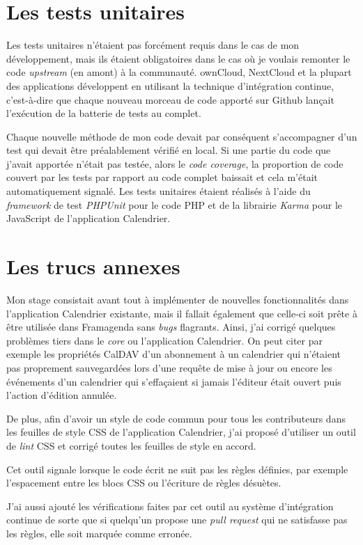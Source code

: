 \documentclass[10pt,a4paper]{report}
\begin{document}
	\section{Les tests unitaires}
	Les tests unitaires n'étaient pas forcément requis dans le cas de mon développement, mais ils étaient obligatoires dans le cas où je voulais remonter le code \textit{upstream} (en amont) à la communauté. ownCloud, NextCloud et la plupart des applications développent en utilisant la technique d'intégration continue, c'est-à-dire que chaque nouveau morceau de code apporté sur Github lançait l'exécution de la batterie de tests au complet. 
	
	Chaque nouvelle méthode de mon code devait par conséquent s'accompagner d'un test qui devait être préalablement vérifié en local. Si une partie du code que j'avait apportée n'était pas testée, alors le \textit{code coverage}, la proportion de code couvert par les tests par rapport au code complet baissait et cela m'était automatiquement signalé. Les tests unitaires étaient réalisés à l'aide du \textit{framework} de test \textit{PHPUnit} pour le code PHP et de la librairie \textit{Karma} pour le JavaScript de l'application Calendrier.
	
	\section{Les trucs annexes}
	Mon stage consistait avant tout à implémenter de nouvelles fonctionnalités dans l'application Calendrier existante, mais il fallait également que celle-ci soit prête à être utilisée dans Framagenda sans \textit{bugs} flagrants. Ainsi, j'ai corrigé quelques problèmes tiers dans le \textit{core} ou l'application Calendrier.
	On peut citer par exemple les propriétés CalDAV d'un abonnement à un calendrier qui n'étaient pas proprement sauvegardées lors d'une requête de mise à jour ou encore les événements d'un calendrier qui s'effaçaient si jamais l'éditeur était ouvert puis l'action d'édition annulée. 
	
	De plus, afin d'avoir un style de code commun pour tous les contributeurs dans les feuilles de style CSS de l'application Calendrier, j'ai proposé d'utiliser un outil de \textit{lint} CSS et corrigé toutes les feuilles de style en accord. 
	
	Cet outil signale lorsque le code écrit ne suit pas les règles définies, par exemple l'espacement entre les blocs CSS ou l'écriture de règles désuètes.
	
	J'ai aussi ajouté les vérifications faites par cet outil au système d'intégration continue de sorte que si quelqu'un propose une \textit{pull request} qui ne satisfasse pas les règles, elle soit marquée comme erronée.
\end{document}
